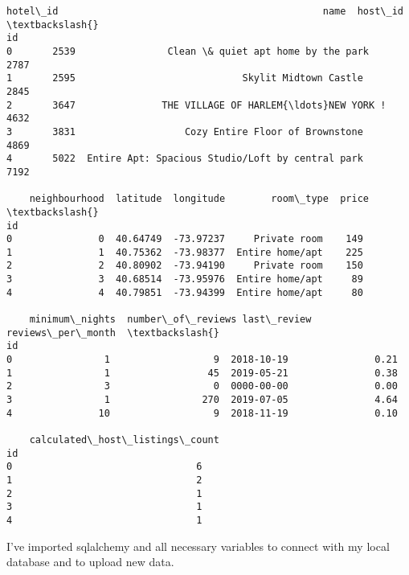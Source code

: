 \documentclass[11pt]{article}
\makeatletter
\newcommand{\boxspacing}{\kern\kvtcb@left@rule\kern\kvtcb@boxsep}
\newcommand{\prompt}[4]{
        \ttfamily\llap{{\color{#2}[#3]:\hspace{3pt}#4}}\vspace{-\baselineskip}
    }
\makeatother
\begin{document}
            \begin{tcolorbox}[breakable, size=fbox, boxrule=.5pt, pad at break*=1mm, opacityfill=0]
\prompt{Out}{outcolor}{14}{\boxspacing}
\begin{Verbatim}[commandchars=\\\{\}]
    hotel\_id                                              name  host\_id  \textbackslash{}
id
0       2539                Clean \& quiet apt home by the park     2787
1       2595                             Skylit Midtown Castle     2845
2       3647               THE VILLAGE OF HARLEM{\ldots}NEW YORK !     4632
3       3831                   Cozy Entire Floor of Brownstone     4869
4       5022  Entire Apt: Spacious Studio/Loft by central park     7192

    neighbourhood  latitude  longitude        room\_type  price  \textbackslash{}
id
0               0  40.64749  -73.97237     Private room    149
1               1  40.75362  -73.98377  Entire home/apt    225
2               2  40.80902  -73.94190     Private room    150
3               3  40.68514  -73.95976  Entire home/apt     89
4               4  40.79851  -73.94399  Entire home/apt     80

    minimum\_nights  number\_of\_reviews last\_review  reviews\_per\_month  \textbackslash{}
id
0                1                  9  2018-10-19               0.21
1                1                 45  2019-05-21               0.38
2                3                  0  0000-00-00               0.00
3                1                270  2019-07-05               4.64
4               10                  9  2018-11-19               0.10

    calculated\_host\_listings\_count
id
0                                6
1                                2
2                                1
3                                1
4                                1
\end{Verbatim}
\end{tcolorbox}
        
    I've imported sqlalchemy and all necessary variables to connect with my
local database and to upload new data.
\end{document}
